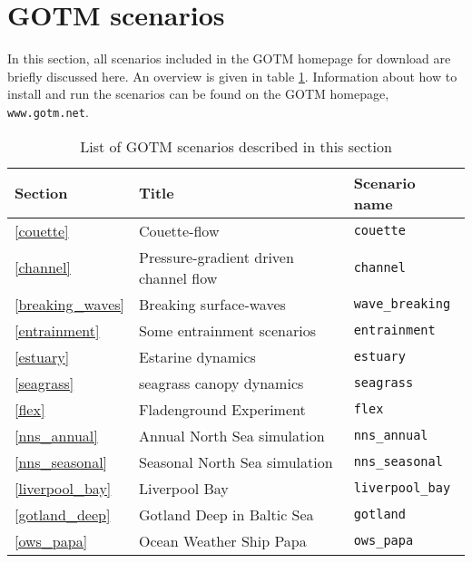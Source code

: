 %
%

\section{GOTM scenarios \label{sec:cases}}

In this section, all scenarios included in the GOTM homepage for download
are briefly discussed here. An overview is given in table 
\ref{table_scenarios}. Information about how to install and run
the scenarios can be found on the GOTM homepage, {\tt www.gotm.net}.

\vspace{10mm}

\begin{table}[h]
\begin{center}
\begin{tabular}{|l|l|l|}
\hline
Section & Title & Scenario name \\ \hline\hline 
\ref{couette} & Couette-flow & {\tt couette} \\ \hline  
\ref{channel} & Pressure-gradient driven channel flow& {\tt channel} \\ \hline
\ref{breaking_waves} & Breaking surface-waves & {\tt wave\_breaking} \\ \hline 
\ref{entrainment} & Some entrainment scenarios & {\tt entrainment} \\ \hline        
\ref{estuary} & Estarine dynamics & {\tt estuary} \\ \hline 
\ref{seagrass} & seagrass canopy dynamics & {\tt seagrass} \\ \hline 
\ref{flex} &Fladenground Experiment  & {\tt flex} \\ \hline 
\ref{nns_annual} & Annual North Sea simulation & {\tt nns\_annual} \\ \hline 
\ref{nns_seasonal} & Seasonal North Sea simulation & {\tt nns\_seasonal} \\ \hline 
\ref{liverpool_bay} &Liverpool Bay  & {\tt liverpool\_bay} \\ \hline 
\ref{gotland_deep} & Gotland Deep in Baltic Sea & {\tt gotland} \\ \hline 
\ref{ows_papa} &Ocean Weather Ship Papa & {\tt ows\_papa} \\ \hline 
\end{tabular}
\caption{List of GOTM scenarios described in this section}
\label{table_scenarios}
\end{center}
\end{table}


